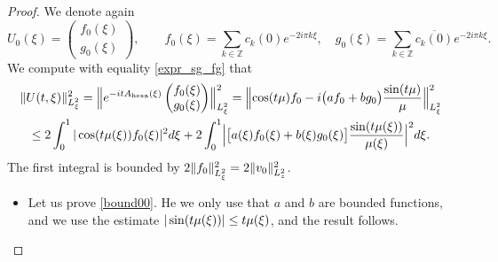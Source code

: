 \documentclass[JEP,XML,SOM,Unicode,NoFloatCountersInSection,published]{cedram}
\theoremstyle{definition}
\let\dis\relax
\newcommand\Z{\mathbb Z}
\newcommand{\bpac}[1]{\bigl[#1\bigr]}
\newcommand{\Babs}[1]{\Bigl|#1\Bigr|}
\begin{document}
\begin{proof}
We denote again
\[
{U_0}(\xi) = \begin{pmatrix} {f}_0(\xi) \\ {g}_0(\xi)\end{pmatrix}, \qquad {f}_0(\xi) = \sum_{k\in\Z} c_k(0)e^{- 2i\pi k \xi}, \quad {g}_0(\xi) = \sum_{k\in\Z} \overline{c_k(0)}e^{- 2i\pi k \xi}.
\]
We compute with equality \eqref{expr_sg_fg} that
\begin{multline*}
\|{U}(t,\xi)\|_{L^2_\xi}^2 = \Bigl\| e^{-it A_{\mathrm{hexa}}(\xi) }\begin{pmatrix} {f}_0(\xi) \\ {g}_0(\xi) \end{pmatrix} \Bigr\|_{L^2_\xi}^2=\Bigl\| \cos(t\mu){f}_0 -i\bigl(a{f}_0+b{g}_0\bigr)\frac{\sin(t\mu)}{\mu}\Bigr\|_{L^2_\xi}^2 \\
\leq 2\int_0^1 |\cos(t\mu(\xi)){f}_0(\xi)|^2d\xi + 2\int_0^1 \Babs{\bpac{a(\xi){f}_0(\xi)+b(\xi){g}_0(\xi)}\frac{\sin(t\mu(\xi))}{\mu(\xi)}}^2d\xi.
\end{multline*}
The first integral is bounded by $\dis 2\| {f}_0\|_{L^2_\xi}^2 = 2 \|v_0 \|_{L^2_z}^2$. 

\begin{itemize}
\item
Let us prove \eqref{bound00}. He we only use that $a$ and $b$ are bounded functions, and we use the estimate $\dis |\sin(t\mu(\xi))| \leq t\mu(\xi)$, and the result follows. 


\end{itemize}
\end{proof}
\end{document}
